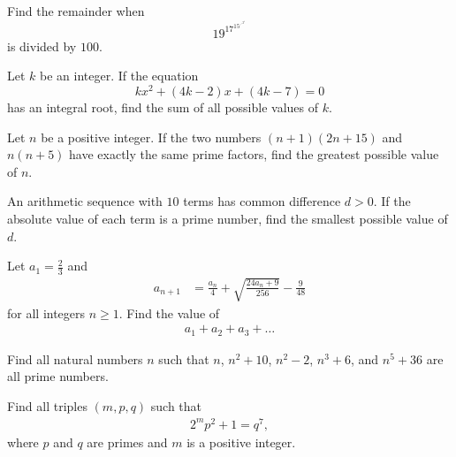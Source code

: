 \documentclass[problems.tex]{subfile}
\begin{document}
	
	\begin{problem}
		Find the remainder when $$19^{17^{15^{\iddots^{3^{1}}}}}$$ is divided by $100$.
	\end{problem}
	
	
	\begin{problem}
		Let $k$ be an integer. If the equation $$kx^2 + (4k - 2)x + (4k - 7) = 0$$ has an integral root, find the sum of all possible values of $k$.
	\end{problem}
	
	
	\begin{problem}
		Let $n$ be a positive integer. If the two numbers $(n + 1)(2n + 15)$ and $n(n + 5)$ have exactly the same prime factors, find the greatest possible value of $n$.
	\end{problem}
	
	
	
	\begin{problem}
		An arithmetic sequence with $10$ terms has common difference $d > 0$. If the absolute value of each term is a prime number, find the smallest possible value of $d$.
	\end{problem}
	
	
	
	
	
	\begin{problem}
		Let $a_1 = \frac{2}{3}$ and
		\begin{align*}
			a_{n+1} &= \frac{a_n}{4} + \sqrt{\frac{24a_n+9}{256}} - \frac{9}{48}
		\end{align*}
		for all integers $n \geq 1$. Find the value of
		\begin{align*}
			a_1+a_2+a_3+\dots
		\end{align*}
	\end{problem}
	
	
	\begin{problem}
		Find all natural numbers $n$ such that $n$, $n^2+10$, $n^2-2$, $n^3+6$, and $n^5+36$ are all prime numbers. %
	\end{problem}
	
	
	
	\begin{problem}
		Find all triples $(m,p,q)$ such that
		\begin{align*}
			2^mp^2 +1=q^7,
		\end{align*}
		where $p$ and $q$ are primes and $m$ is a positive integer. %
	\end{problem}
	
\end{document}
